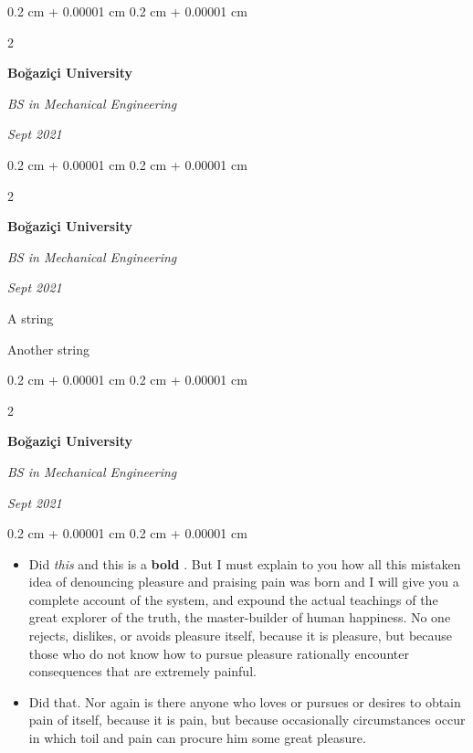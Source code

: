 \documentclass[10pt, letterpaper]{article}
\newenvironment{summary}{
    \begin{description}[
        topsep=0.10 cm,
        parsep=0.10 cm,
        partopsep=0pt,
        itemsep=0pt,
        leftmargin=0.4 cm + 10pt
    ]
}{
    \end{description}
} %
\newenvironment{highlights}{
    \begin{itemize}[
        topsep=0.10 cm,
        parsep=0.10 cm,
        partopsep=0pt,
        itemsep=0pt,
        leftmargin=0.4 cm + 10pt
    ]
}{
    \end{itemize}
} %
\newenvironment{onecolentry}{
    \begin{adjustwidth}{
        0.2 cm + 0.00001 cm
    }{
        0.2 cm + 0.00001 cm
    }
}{
    \end{adjustwidth}
} %
\newenvironment{twocolentry}[2][]{
    \onecolentry
    \def\secondColumn{#2}
    \setcolumnwidth{\fill, 4.5 cm}
    \begin{paracol}{2}
}{
    \switchcolumn \raggedleft \secondColumn
    \end{paracol}
    \endonecolentry
} %
\let\hrefWithoutArrow\href
\renewcommand{\href}[2]{\hrefWithoutArrow{#1}{\ifthenelse{\equal{#2}{}}{ }{#2 }\raisebox{.15ex}{\footnotesize \faExternalLink*}}}
\begin{document}
        \begin{twocolentry}{
            
            
        \textit{Sept 2021}}
            \textbf{Boğaziçi University}

            \textit{BS in Mechanical Engineering}
        \end{twocolentry}


        \vspace{0.2 cm}

        \begin{twocolentry}{
            
            
        \textit{Sept 2021}}
            \textbf{Boğaziçi University}

            \textit{BS in Mechanical Engineering}
        \end{twocolentry}
            \begin{summary}
                \item A string
                \item Another string
            \end{summary}


        \vspace{0.2 cm}

        \begin{twocolentry}{
            
            
        \textit{Sept 2021}}
            \textbf{Boğaziçi University}

            \textit{BS in Mechanical Engineering}
        \end{twocolentry}
        \vspace{0.10 cm}
        \begin{onecolentry}
            \begin{highlights}
                \item Did \textit{this} and this is a \textbf{bold} \href{https://example.com}{link}. But I must explain to you how all this mistaken idea of denouncing pleasure and praising pain was born and I will give you a complete account of the system, and expound the actual teachings of the great explorer of the truth, the master-builder of human happiness. No one rejects, dislikes, or avoids pleasure itself, because it is pleasure, but because those who do not know how to pursue pleasure rationally encounter consequences that are extremely painful.
                \item Did that. Nor again is there anyone who loves or pursues or desires to obtain pain of itself, because it is pain, but because occasionally circumstances occur in which toil and pain can procure him some great pleasure.
            \end{highlights}
        \end{onecolentry}
\end{document}
